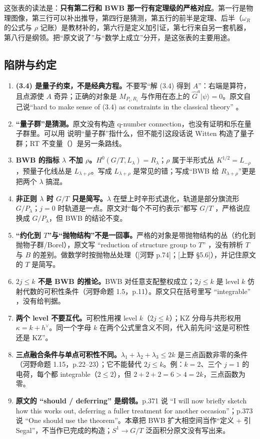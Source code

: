 这张表的读法是：\textbf{只有第二行和 BWB 那一行有定理级的严格对应}。第一行是物理图像，第三行可以补出推导，第四行是猜测，第五行的前半是定理、后半（$\omega_R$ 的公式与 $\rho$ 记账）是教材补的，第六行是定义加引证，第七行来自另一套机器，第八行是纲领。把“原文说了”与“数学上成立”分开，是这张表的主要用途。

\subsection{陷阱与约定}
\label{sec:ch6-traps}

\begin{enumerate}[leftmargin=1.7em,itemsep=3pt]
\item \textbf{(3.4) 是量子约束，不是经典方程。}不要写“解 (3.4) 得到 $A$”：右端是算符，且点源使 $A$ 奇异；正确的对象是 $M_{P_i,R_i}$ 与作用在态上的 $\hat G^a|\psi\rangle=0$。原文自己说“hard to make sense of (3.4) as constraints in the classical theory” 。
\item \textbf{“量子群”是猜测。}原文没有构造 q-number connection，也没有证明和乐在量子群里。可以用 \cite{drinfeld1986} 说明“量子群”指什么，但不能引这段话说 Witten 构造了量子群；RT 不变量（\cite{rt1991}）是另一条路线。
\item \textbf{BWB 的指标 $\lambda$ 不加 $\rho$。}$H^0(G/T,L_\lambda)=R_\lambda$；$\rho$ 属于半形式丛 $K^{1/2}=L_{-\rho}$，预量子化线丛是 $L_{\lambda+\rho}$。写成 $L_{\lambda+\rho}$ 是常见的错；写成“BWB 给 $R_{\lambda+\rho}$”更是把两个 $\lambda$ 搞混。
\item \textbf{非正则 $\lambda$ 时 $G/T$ 只是简写。}$\lambda$ 在壁上时辛形式退化，轨道是部分旗流形 $G/P_\lambda$；$j=0$ 时轨道是一点。原文对“每个不可约表示”都写 $G/T$ ，严格说应换成 $G/P_\lambda$，但 BWB 的结论不变。
\item \textbf{“约化到 $T$”与“抛物结构”不是一回事。}严格的对象是带抛物结构的丛（约化到抛物子群/Borel），原文写 “reduction of structure group to $T$” ，没有辨析 $T$ 与 $B$ 的差别。做数学时按抛物丛处理（[河野 p.74]；[上野 \S5.6]），并记住原文的 $T$ 是简写。
\item \textbf{$2j\le k$ 不是 BWB 的推论。}BWB 对任意支配整权成立；$2j\le k$ 是 level $k$ 仿射代数的可积性条件（河野命题 1.5，p.11）。原文只在括号里写 “integrable” ，没有给判据。
\item \textbf{两个 level 不要互代。}可积性用裸 level $k$（$2j\le k$）；KZ 分母与共形权用 $\kappa=k+h^\vee$。同一个字母 $k$ 在两个公式里含义不同，代入前先问“这是可积性还是 KZ”。
\item \textbf{三点融合条件与单点可积性不同。}$\lambda_1+\lambda_2+\lambda_3\le2k$ 是三点函数非零的条件（河野命题 1.15，p.22--23）；它不能替代 $2j\le k$。例：$k=2$、三个 $j=1$ 的电荷，每个都 integrable（$2\le2$），但 $2+2+2=6>4=2k$，三点函数为零。
\item \textbf{原文的 “should / deferring” 是纲领。}p.371 说 “I will now briefly sketch how this works out, deferring a fuller treatment for another occasion”；p.373 说 “One should use the theorem”。本章把 BWB 扩大相空间当作“定义 + 引 Segal”，不当作已完成的构造；$S^1\to G/T$ 泛函积分原文没有写出来。
\end{enumerate}

